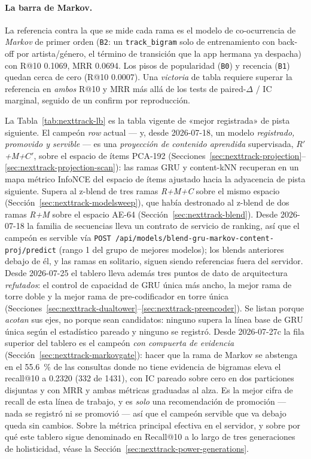 \documentclass[11pt]{article}
\newcommand{\Rp}{\ensuremath{R'}}
\newcommand{\Cp}{\ensuremath{C'}}
\begin{document}
\paragraph{La barra de Markov.} La referencia contra la que se mide cada rama es el
modelo de co-ocurrencia de \emph{Markov} de primer orden (\texttt{B2}: un
\texttt{track\_bigram} solo de entrenamiento con back-off por artista/género, el
término de transición que la app hermana ya despacha) con R@10 \num{0.1069}, MRR
\num{0.0694}. Los pisos de popularidad (\texttt{B0}) y recencia (\texttt{B1})
quedan cerca de cero (R@10 \num{0.0007}). Una \emph{victoria} de tabla requiere
superar la referencia en \emph{ambos} R@10 y MRR más allá de los tests de
paired-$\Delta$ / IC marginal, seguido de un confirm por reproducción.

La Tabla~\ref{tab:nexttrack-lb} es la tabla vigente de «mejor registrada» de
pista siguiente. El campeón \emph{row} actual --- y, desde 2026-07-18, un modelo
\emph{registrado, promovido y servible} --- es una \emph{proyección de contenido
aprendida} supervisada, \emph{\Rp+M+\Cp}, sobre el espacio de ítems PCA-192
(Secciones~\ref{sec:nexttrack-projection}--\ref{sec:nexttrack-projection-scan}): las
ramas GRU y content-kNN recuperan en un mapa métrico InfoNCE del espacio de ítems
ajustado hacia la adyacencia de pista siguiente. Supera al z-blend de tres ramas
\emph{R+M+C} sobre el mismo espacio (Sección~\ref{sec:nexttrack-modelsweep}), que
había destronado al z-blend de dos ramas \emph{R+M} sobre el espacio AE-64
(Sección~\ref{sec:nexttrack-blend}). Desde 2026-07-18 la familia de secuencias lleva
un contrato de servicio de ranking, así que el campeón es servible vía
\texttt{POST /api/models/blend-gru-markov-content-proj/predict} (rango 1 del grupo de
mejores modelos); los blends anteriores debajo de él, y las ramas en solitario,
siguen siendo referencias fuera del servidor. Desde 2026-07-25 el tablero lleva
además tres puntos de dato de arquitectura \emph{refutados}: el control de
capacidad de GRU única más ancho, la mejor rama de torre doble y la mejor rama de
pre-codificador en torre única
(Secciones~\ref{sec:nexttrack-dualtower}--\ref{sec:nexttrack-preencoder}). Se
listan porque \emph{acotan} sus ejes, no porque sean candidatos: ninguno supera
la línea base de GRU única según el estadístico pareado y ninguno se registró.
Desde 2026-07-27c la fila superior del tablero es el campeón \emph{con compuerta de
evidencia} (Sección~\ref{sec:nexttrack-markovgate}): hacer que la rama de Markov se
abstenga en el \SI{55.6}{\percent} de las consultas donde no tiene evidencia de
bigramas eleva el recall@10 a \num{0.2320} (\num{332} de \num{1431}), con IC
pareado sobre cero en dos particiones disjuntas y con MRR y ambas métricas graduadas
al alza. Es la mejor cifra de recall de esta línea de trabajo, y es \emph{solo} una
recomendación de promoción --- nada se registró ni se promovió --- así que el campeón
servible que va debajo queda sin cambios.
Sobre la métrica principal efectiva en el servidor, y sobre por qué este tablero
sigue denominado en Recall@10 a lo largo de tres generaciones de holisticidad,
véase la Sección~\ref{sec:nexttrack-power-generations}.
\end{document}
